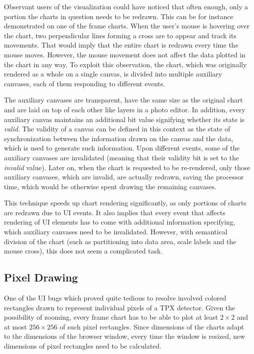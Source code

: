 Observant users of the visualization could have noticed that often enough, only a portion the charts in question needs to be redrawn. This can be for instance demonstrated on one of the frame charts. When the user's mouse is hovering over the chart, two perpendicular lines forming a cross are to appear and track its movements. That would imply that the entire chart is redrawn every time the mouse moves. However, the mouse movement does not affect the data plotted in the chart in any way. To exploit this observation, the chart, which was originally rendered as a whole on a single canvas, is divided into multiple auxiliary canvases, each of them responding to different events.

The auxiliary canvases are transparent, have the same size as the original chart and are laid on top of each other like layers in a photo editor. In addition, every auxiliary canvas maintains an additional bit value signifying whether its state is \textit{valid}. The validity of a canvas can be defined in this context as the state of synchronization between the information drawn on the canvas and the data, which is used to generate such information. Upon different events, some of the auxiliary canvases are invalidated (meaning that their validity bit is set to the \textit{invalid} value). Later on, when the chart is requested to be re-rendered, only those auxiliary canvases, which are invalid, are actually redrawn, saving the processor time, which would be otherwise spent drawing the remaining canvases.

This technique speeds up chart rendering significantly, as only portions of charts are redrawn due to UI events. It also implies that every event that affects rendering of UI elements has to come with additional information specifying, which auxiliary canvases need to be invalidated. However, with semantical division of the chart (such as partitioning into data area, scale labels and the mouse cross), this does not seem a complicated task.

\subsection{Pixel Drawing}
One of the UI bugs which proved quite tedious to resolve involved colored rectangles drawn to represent individual pixels of a TPX detector. Given the possibility of zooming, every frame chart has to be able to plot at least $2\times 2$ and at most $256\times 256$ of such pixel rectangles. Since dimensions of the charts adapt to the dimensions of the browser window, every time the window is resized, new dimensions of pixel rectangles need to be calculated.

